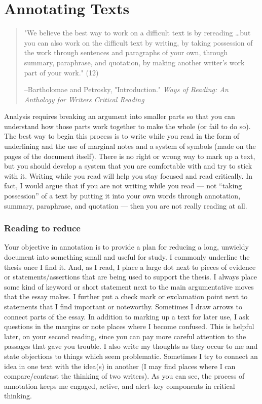 


\chapter{Annotating Texts}

\begin{quote}
\small
"We believe the best way to work on a difficult text is by rereading \dots but you can also work on the difficult text by writing, by taking possession of the work through sentences and paragraphs of your own, through summary, paraphrase, and quotation, by making another writer’s work part of your work." (12)

--Bartholomae and Petrosky, "Introduction." \emph{Ways of Reading: An Anthology for Writers
Critical Reading}

\end{quote}

Analysis requires breaking an argument into smaller parts so that you can understand how those parts work together to make the whole (or fail to do so). The best way to begin this process is to write while you read in the form of underlining and the use of marginal notes and a system of symbols (made on the pages of the document itself). There is no right or wrong way to mark up a text, but you should develop a system that you are comfortable with and try to stick with it. Writing while you read will help you stay focused and read critically. In fact, I would argue that if you are not writing while you read — not “taking possession” of a text by putting it into your own words through annotation, summary, paraphrase, and quotation — then you are not really reading at all.

\subsection{Reading to reduce}

Your objective in annotation is to provide a plan for reducing a long, unwieldy document into something small and useful for study. I commonly underline the thesis once I find it. And, as I read, I place a large dot next to pieces of evidence or statements/assertions that are being used to support the thesis. I always place some kind of keyword or short statement next to the main argumentative moves that the essay makes. I further put a check mark or exclamation point next to statements that I find important or noteworthy. Sometimes I draw arrows to connect parts of the essay. In addition to marking up a text for later use, I ask questions in the margins or note places where I become confused. This is helpful later, on your second reading, since you can pay more careful attention to the passages that gave you trouble. I also write my thoughts as they occur to me and state objections to things which seem problematic. Sometimes I try to connect an idea in one text with the idea(s) in another (I may find places where I can compare/contrast the thinking of two writers). As you can see, the process of annotation keeps me engaged, active, and alert--key components in critical thinking. 

